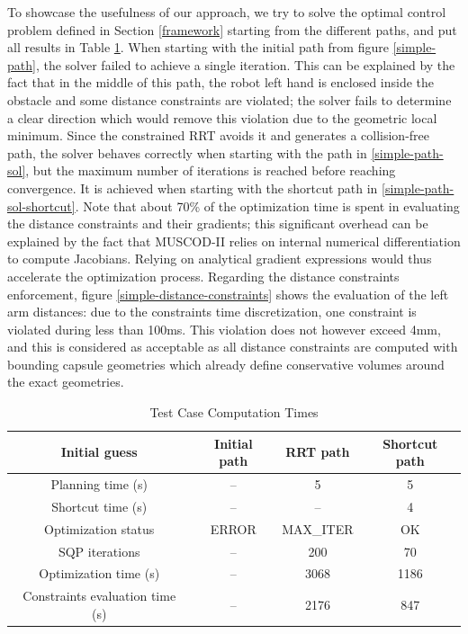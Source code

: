 To showcase the usefulness of our approach, we try to solve the
optimal control problem defined in Section \ref{framework} starting
from the different paths, and put all results in Table
\ref{table}. When starting with the initial path from figure
\ref{simple-path}, the solver failed to achieve a single
iteration. This can be explained by the fact that in the middle of
this path, the robot left hand is enclosed inside the obstacle and
some distance constraints are violated; the solver fails to determine
a clear direction which would remove this violation due to the
geometric local minimum. Since the constrained RRT avoids it and
generates a collision-free path, the solver behaves correctly when
starting with the path in \ref{simple-path-sol}, but the maximum
number of iterations is reached before reaching convergence. It is
achieved when starting with the shortcut path in
\ref{simple-path-sol-shortcut}. Note that about 70\% of the
optimization time is spent in evaluating the distance constraints and
their gradients; this significant overhead can be explained by the
fact that \textsc{MUSCOD-II} relies on internal numerical
differentiation to compute Jacobians. Relying on analytical gradient
expressions would thus accelerate the optimization process. Regarding
the distance constraints enforcement, figure
\ref{simple-distance-constraints} shows the evaluation of the left arm
distances: due to the constraints time discretization, one constraint
is violated during less than 100ms. This violation does not however
exceed 4mm, and this is considered as acceptable as all distance
constraints are computed with bounding capsule geometries which
already define conservative volumes around the exact geometries.

\begin{table}
  \renewcommand{\arraystretch}{1.3}
  \caption{Test Case Computation Times}
  \label{table}
  \centering
  \begin{tabular}{|c||c|c|c|}
    \hline
    Initial guess & Initial path & RRT path & Shortcut path \\
    \hline
    Planning time (s) & -- & 5 & 5 \\
    \hline
    Shortcut time (s) & -- & -- & 4 \\
    \hline
    Optimization status & ERROR & MAX\_ITER & OK \\
    \hline
    SQP iterations & -- & 200 & 70 \\
    \hline
    Optimization time (s) & -- & 3068 & 1186 \\
    \hline
    Constraints evaluation time (s) & -- & 2176 & 847 \\
    \hline
  \end{tabular}
\end{table}

